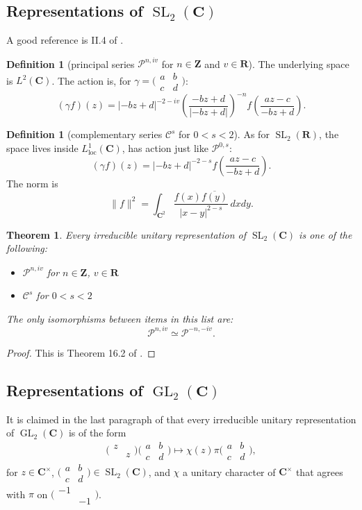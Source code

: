\documentclass{article}
\DeclareMathOperator{\generallinear}{GL}
\DeclareMathOperator{\speciallinear}{SL}
\newcommand{\dC}{\mathbf{C}}
\newcommand{\dR}{\mathbf{R}}
\newcommand{\dZ}{\mathbf{Z}}
\newcommand{\complementaryseries}{\mathcal{C}}
\newcommand{\principalseries}{\mathcal{P}}
\newcommand{\smat}[4]{\bigl(\begin{smallmatrix} {#1} & {#2} \\ {#3} & {#4} \end{smallmatrix} \bigr)}
\newtheorem{theorem}[subsubsection]{Theorem}
\theoremstyle{definition}
\newtheorem{definition}[subsubsection]{Definition}
\begin{document}
\subsection{Representations of \texorpdfstring{$\speciallinear_2(\dC)$}{SL2C}}

A good reference is II.4 of \cite{kn86}. 

\begin{definition}[principal series $\principalseries^{n, i v}$ for $n\in \dZ$ and $v\in \dR$]
The underlying space is $L^2(\dC)$. The action is, for $\gamma=\smat a b c d$: 
\[
  (\gamma f)(z) = |-b z+d|^{-2-i v}\left(\frac{-b z+d}{|-b z+d|}\right)^{-n} f\left(\frac{a z-c}{-b z+d}\right) . 
\]
\end{definition}

\begin{definition}[complementary series $\complementaryseries^s$ for $0<s<2$]
As for $\speciallinear_2(\dR)$, the space lives inside $L^1_\text{loc}(\dC)$, 
has action just like $\principalseries^{0, s}$: 
\[
  (\gamma f)(z) = |-b z+d|^{-2-s} f\left(\frac{a z-c}{-b z+d}\right) .
\]
The norm is 
\[
  \|f\|^2 = \int_{\dC^2} \frac{f(x)\overline{f(y)}}{|x-y|^{2-s}}\, dxdy .
\]
\end{definition}

\begin{theorem}
Every irreducible unitary representation of $\speciallinear_2(\dC)$ is one of 
the following:
\begin{itemize}
  \item $\principalseries^{n, i v}$ for $n\in \dZ$, $v\in \dR$ 
  \item $\complementaryseries^s$ for $0<s<2$
\end{itemize}
The only isomorphisms between items in this list are: 
\[
  \principalseries^{n, i v} \simeq \principalseries^{-n, -i v}. 
\]
\end{theorem}
\begin{proof}
This is Theorem 16.2 of \cite{kn86}. 
\end{proof}


\subsection{Representations of \texorpdfstring{$\generallinear_2(\dC)$}{GL2C}}

It is claimed in the last paragraph of \cite{kn79} that every irreducible 
unitary representation of $\generallinear_2(\dC)$ is of the form 
\[
  \smat{z}{}{}{z} \smat a b c d \mapsto \chi(z) \pi\smat a b c d ,
\]
for $z\in \dC^\times$, $\smat a b c d\in \speciallinear_2(\dC)$, and 
$\chi$ a unitary character of $\dC^\times$ that agrees with $\pi$ on 
$\smat{-1}{}{}{-1}$. 







\end{document}
